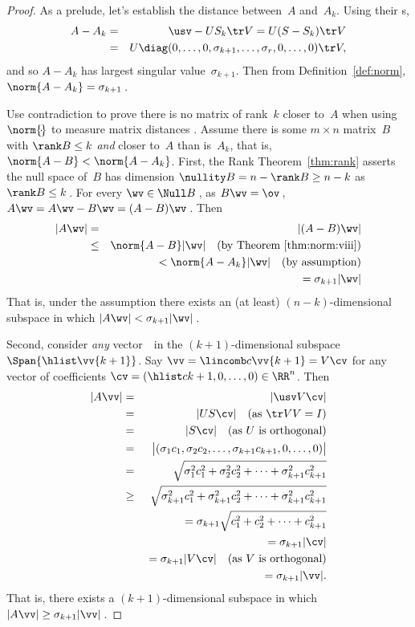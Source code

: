 \begin{proof} 
As a prelude, let's establish the distance between~\(A\) and~\(A_k\). 
Using their \svd{}s,
\begin{eqnarray*}
A-A_k&=&\usv-US_k\tr V=U(S-S_k)\tr V
\\&=&U\diag(0,\ldots,0,\sigma_{k+1},\ldots,\sigma_r,0,\ldots,0)\tr V,
\end{eqnarray*}
and so \(A-A_k\) has largest singular value~\(\sigma_{k+1}\).
Then from Definition~\ref{def:norm}, \(\norm{A-A_k}=\sigma_{k+1}\)\,.

Use contradiction to prove there is no matrix of rank~\(k\) closer to~\(A\) when using \(\norm{\cdot}\) to measure matrix distances \cite[p.36]{Trefethen1997}.
Assume there is some \(m\times n\) matrix~\(B\) with \(\rank B\leq k\) \emph{and}  closer to~\(A\) than is~\(A_k\), that is, \(\norm{A-B}<\norm{A-A_k}\).
First, the Rank Theorem~\ref{thm:rank} asserts the null space of~\(B\) has dimension \(\nullity B =n-\rank B\geq n-k\) as  \(\rank B\leq k\)\,.
For every \(\wv\in\Null B\)\,,  as \(B\wv=\ov\)\,,  \(A\wv=A\wv-B\wv=(A-B)\wv\)\,. 
Then
\begin{eqnarray*}
|A\wv|&=&|(A-B)\wv|
\\&\leq&\norm{A-B}|\wv| 
\quad(\text{by Theorem~\ref{thm:norm:viii}})
\\&&{}<\norm{A-A_k}|\wv|
\quad(\text{by assumption})
\\&&\phantom{{}<}{}=\sigma_{k+1}|\wv|
\end{eqnarray*}
That is, under the assumption there exists an (at least) \((n-k)\)-dimensional subspace in which \(|A\wv|<\sigma_{k+1}|\wv|\)\,.

Second, consider \emph{any} vector~\vv\ in the \((k+1)\)-dimensional subspace \(\Span\{\hlist\vv{k+1}\}\).
Say \(\vv=\lincomb c\vv{k+1}=V\cv\) for any vector of coefficients \(\cv=(\hlist c{k+1},0,\ldots,0)\in\RR^n\).
Then
\begin{eqnarray*}
|A\vv|&=&|\usv V\cv|
\\&=&|US\cv| \quad(\text{as }\tr VV=I)
\\&=&|S\cv| \quad(\text{as \(U\) is orthogonal})
\\&=&\big|(\sigma_1c_1,\sigma_2c_2,\ldots,\sigma_{k+1}c_{k+1},0,\ldots,0)\big|
\\&=&\sqrt{\sigma_1^2c_1^2+\sigma_2^2c_2^2+\cdots+\sigma_{k+1}^2c_{k+1}^2}
\\&\geq&\sqrt{\sigma_{k+1}^2c_1^2+\sigma_{k+1}^2c_2^2+\cdots+\sigma_{k+1}^2c_{k+1}^2}
\\&&{}=\sigma_{k+1}\sqrt{c_1^2+c_2^2+\cdots+c_{k+1}^2}
\\&&{}=\sigma_{k+1}|\cv|
\\&&{}=\sigma_{k+1}|V\cv|\quad(\text{as \(V\) is orthogonal})
\\&&{}=\sigma_{k+1}|\vv|.
\end{eqnarray*}
That is, there exists a \((k+1)\)-dimensional subspace in which \(|A\vv|\geq\sigma_{k+1}|\vv|\)\,.


\end{proof}
